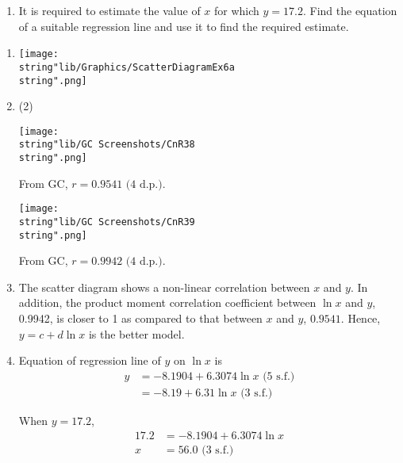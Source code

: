 \documentclass[11pt,a4paper]{book}
\begin{document}
\begin{example}
\begin{enumerate}[label=(\alph*),start=2]
\item  It is required to estimate the value of $x$ for which $y=17.2$.
Find the equation of a suitable regression line and use it to find
the required estimate.

\end{enumerate}

\Solution

\begin{enumerate}[label=(\alph*)]

\item  \texttt{[image: \\string"lib/Graphics/ScatterDiagramEx6a\\string".png]}

\newpage

\item \begin{tasks}[label=(\roman*),label-width=3.5ex](2)

\task \texttt{[image: \\string"lib/GC Screenshots/CnR38\\string".png]}

From GC, $r=0.9541\text{ (4 d.p.)}$.

\task \texttt{[image: \\string"lib/GC Screenshots/CnR39\\string".png]}

From GC, $r=0.9942\text{ (4 d.p.)}$.

\end{tasks}

\item  The scatter diagram shows a non-linear correlation between
$x$ and $y$. In addition, the product moment correlation coefficient
between $\ln x$ and $y$, 0.9942, is closer to 1 as compared to that
between $x$ and $y$, $0.9541$. Hence, $y=c+d\ln x$ is the better
model.

\item  Equation of regression line of $y$ on $\ln x$ is
\begin{align*}
y & =-8.1904+6.3074\ln x\text{ (5 s.f.)}\\
 & =-8.19+6.31\ln x\text{ (3 s.f.)}
\end{align*}

When $y=17.2$,
\begin{align*}
17.2 & =-8.1904+6.3074\ln x\\
x & =56.0\text{ (3 s.f.)}
\end{align*}

\end{enumerate}
\end{example}

\end{document}
